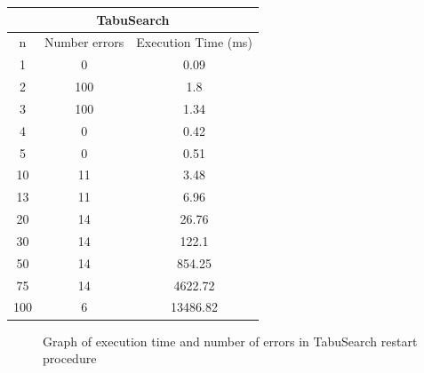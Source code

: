 \documentclass[a4paper,10pt]{article}
\begin{document}
\begin{center}
\begin{tabular}{|c|c|c|}
\hline
\multicolumn{3}{|c|}{TabuSearch}\\
\hline
n & Number errors & Execution Time (ms) \\
\hline
1 & 0 & 0.09\\
\hline
2 & 100 & 1.8\\
\hline
3 & 100 & 1.34\\
\hline
4 & 0 & 0.42\\
\hline
5 & 0 & 0.51\\
\hline
10 & 11 & 3.48\\
\hline
13 & 11 & 6.96\\
\hline
20 & 14 & 26.76\\
\hline
30 & 14 & 122.1\\
\hline
50 & 14 & 854.25\\
\hline
75 & 14 & 4622.72 \\
\hline
100 & 6 & 13486.82 \\
\hline
\end{tabular}
\end{center}

\begin{figure}[H]
    \center
     \quad
    \caption{Graph of execution time and number of errors in TabuSearch restart procedure}
\end{figure}
\end{document}
